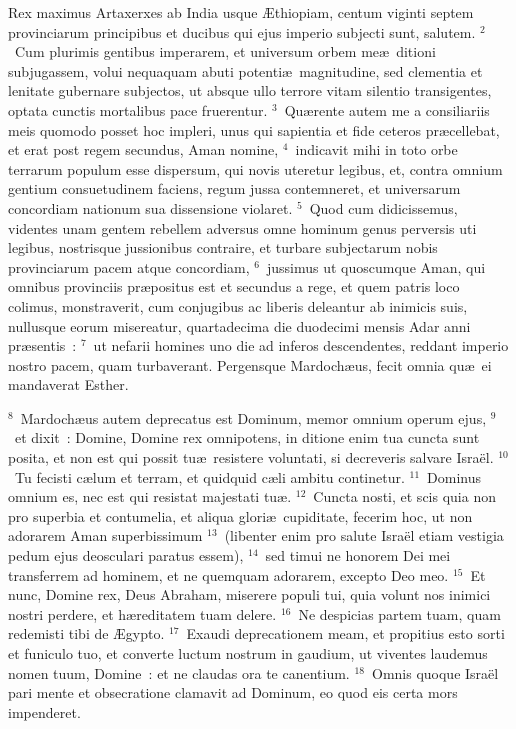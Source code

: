 \lettrine[lines=3,image=true,loversize=0.05,lraise=-0.03]{R}{}ex maximus Artaxerxes ab India usque \AE thiopiam, centum viginti septem provinciarum principibus et ducibus qui ejus imperio subjecti sunt, salutem.
${}^{2}$~Cum plurimis gentibus imperarem, et universum orbem me\ae\ ditioni subjugassem, volui nequaquam abuti potenti\ae\ magnitudine, sed clementia et lenitate gubernare subjectos, ut absque ullo terrore vitam silentio transigentes, optata cunctis mortalibus pace fruerentur.
${}^{3}$~Qu\ae rente autem me a consiliariis meis quomodo posset hoc impleri, unus qui sapientia et fide ceteros pr\ae cellebat, et erat post regem secundus, Aman nomine,
${}^{4}$~indicavit mihi in toto orbe terrarum populum esse dispersum, qui novis uteretur legibus, et, contra omnium gentium consuetudinem faciens, regum jussa contemneret, et universarum concordiam nationum sua dissensione violaret.
${}^{5}$~Quod cum didicissemus, videntes unam gentem rebellem adversus omne hominum genus perversis uti legibus, nostrisque jussionibus contraire, et turbare subjectarum nobis provinciarum pacem atque concordiam,
${}^{6}$~jussimus ut quoscumque Aman, qui omnibus provinciis pr\ae positus est et secundus a rege, et quem patris loco colimus, monstraverit, cum conjugibus ac liberis deleantur ab inimicis suis, nullusque eorum misereatur, quartadecima die duodecimi mensis Adar anni pr\ae sentis~:
${}^{7}$~ut nefarii homines uno die ad inferos descendentes, reddant imperio nostro pacem, quam turbaverant. Pergensque Mardoch\ae us, fecit omnia qu\ae\ ei mandaverat Esther.


${}^{8}$~Mardoch\ae us autem deprecatus est Dominum, memor omnium operum ejus,
${}^{9}$~et dixit~: Domine, Domine rex omnipotens, in ditione enim tua cuncta sunt posita, et non est qui possit tu\ae\ resistere voluntati, si decreveris salvare Isra\"el.
${}^{10}$~Tu fecisti c\ae lum et terram, et quidquid c\ae li ambitu continetur.
${}^{11}$~Dominus omnium es, nec est qui resistat majestati tu\ae .
${}^{12}$~Cuncta nosti, et scis quia non pro superbia et contumelia, et aliqua glori\ae\ cupiditate, fecerim hoc, ut non adorarem Aman superbissimum
${}^{13}$~(libenter enim pro salute Isra\"el etiam vestigia pedum ejus deosculari paratus essem),
${}^{14}$~sed timui ne honorem Dei mei transferrem ad hominem, et ne quemquam adorarem, excepto Deo meo.
${}^{15}$~Et nunc, Domine rex, Deus Abraham, miserere populi tui, quia volunt nos inimici nostri perdere, et h\ae reditatem tuam delere.
${}^{16}$~Ne despicias partem tuam, quam redemisti tibi de \AE gypto.
${}^{17}$~Exaudi deprecationem meam, et propitius esto sorti et funiculo tuo, et converte luctum nostrum in gaudium, ut viventes laudemus nomen tuum, Domine~: et ne claudas ora te canentium.
${}^{18}$~Omnis quoque Isra\"el pari mente et obsecratione clamavit ad Dominum, eo quod eis certa mors impenderet.

